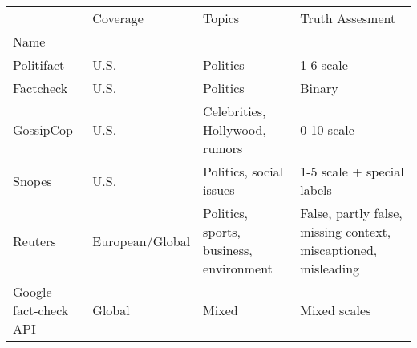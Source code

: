 \begin{tabular}{p{1.8cm}|p{1.8cm}|p{3cm}|p{3cm}}
\toprule
{} &         Coverage &                                   Topics &                                                 Truth Assesment \\
Name                  &                  &                                          &                                                                 \\
\midrule
Politifact            &             U.S. &                                 Politics &                                                       1-6 scale \\
Factcheck             &             U.S. &                                 Politics &                                                          Binary \\
GossipCop             &            U.S.  &           Celebrities, Hollywood, rumors &                                                      0-10 scale \\
Snopes                &             U.S. &                  Politics, social issues &                                      1-5 scale + special labels \\
Reuters               &  European/Global &  Politics, sports, business, environment &  False, partly false, missing context, miscaptioned, misleading \\
Google fact-check API &           Global &                                    Mixed &                                                    Mixed scales \\
\bottomrule
\end{tabular}

